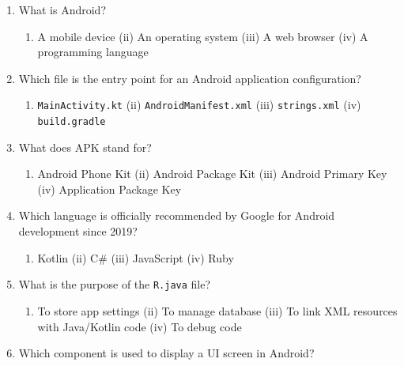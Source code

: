 \documentclass[11pt,a4paper]{article}
\begin{document}
\begin{enumerate}[label=(\alph*)]
    \item What is Android?
    
\begin{enumerate}[label=(\roman*)]
        \item A mobile device \quad (ii) An operating system \quad (iii) A web browser \quad (iv) A programming language
    \end{enumerate}
    
    \item Which file is the entry point for an Android application configuration?
    
\begin{enumerate}[label=(\roman*)]
        \item   \texttt{MainActivity.kt} \quad (ii)   \texttt{AndroidManifest.xml} \quad (iii)   \texttt{strings.xml} \quad (iv)   \texttt{build.gradle}
    \end{enumerate}

    \item What does APK stand for?
    
\begin{enumerate}[label=(\roman*)]
        \item Android Phone Kit \quad (ii) Android Package Kit \quad (iii) Android Primary Key \quad (iv) Application Package Key
    \end{enumerate}

    \item Which language is officially recommended by Google for Android development since 2019?
    
\begin{enumerate}[label=(\roman*)]
        \item Kotlin \quad (ii) C\# \quad (iii) JavaScript \quad (iv) Ruby
    \end{enumerate}

    \item What is the purpose of the   \texttt{R.java} file?
    
\begin{enumerate}[label=(\roman*)]
        \item To store app settings \quad (ii) To manage database \quad (iii) To link XML resources with Java/Kotlin code \quad (iv) To debug code
    \end{enumerate}

    \item Which component is used to display a UI screen in Android?
    

\end{enumerate}
\end{document}

